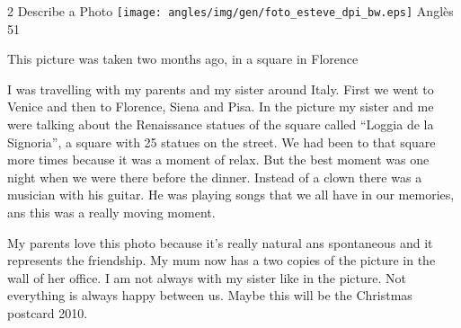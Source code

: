 %
%
\begin{news}
{2} %
{Describe a Photo}
{\noindent\texttt{[image: angles/img/gen/foto\_esteve\_dpi\_bw.eps]}}
{Anglès}
{51} %


This picture was taken two months ago, in a square in Florence

I was travelling with my parents and my sister around Italy. First we went to Venice and then to Florence, Siena and Pisa. In the picture my sister and me were talking about the Renaissance statues of the square called “Loggia de la Signoria”, a square with 25 statues on the street. We had been to that square more times because it was a moment of relax. But the best moment was one night when we were there before the dinner. Instead of a clown there was a musician with his guitar. He was playing songs that we all have in our memories, ans this was a really moving moment.

My parents love this photo because it's really natural ans spontaneous and it represents the friendship. My mum now has a two copies of the picture in the wall of her office. I am not always with my sister like in the picture. Not everything is always happy between us. Maybe this will be the Christmas postcard 2010.



\end{news}
